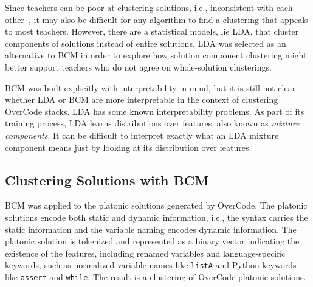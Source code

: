 Since teachers can be poor at clustering solutions, i.e., inconsistent with each other~\cite{berkeleymastersthesis}, it may also be difficult for any algorithm to find a clustering that appeals to most teachers. However, there are a statistical models, lie LDA, that cluster components of solutions instead of entire solutions. LDA was selected as an alternative to BCM in order to explore how solution component clustering might better support teachers who do not agree on whole-solution clusterings.


BCM was built explicitly with interpretability in mind, but it is still not clear whether LDA or BCM are more interpretable in the context of clustering OverCode stacks. LDA has some known interpretability problems. As part of its training process, LDA learns distributions over features, also known as {\it mixture components}. It can be difficult to interpret exactly what an LDA mixture component means just by looking at its distribution over features.






\subsection{Clustering Solutions with BCM}

BCM was applied to the platonic solutions generated by OverCode. The platonic solutions encode both static and dynamic information, i.e., the syntax carries the static information and the variable naming encodes dynamic information. The platonic solution is tokenized and represented as a binary vector indicating the existence of the features, including renamed variables and language-specific keywords, such as normalized variable names like \texttt{listA} and Python keywords like \texttt{assert} and \texttt{while}. The result is a clustering of OverCode platonic solutions. 

